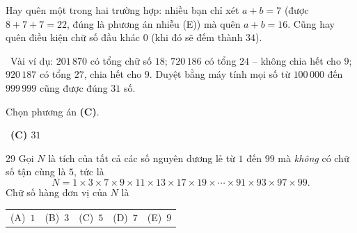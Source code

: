 \documentclass[11pt]{article}
\makeatletter
\providecommand{\AnsWord}{Đáp số}
\newenvironment{probbox}[2]{\begin{probboxT}{#1}{#2}}{\end{probboxT}}
\newcommand{\ans}[1]{\par\smallskip{\bfseries\color{tmGreen!88!black}\AnsWord:}\ {\bfseries\color{AnsRed}#1}\par}
\newcommand{\verify}[1]{\par\smallskip\noindent{\bfseries\color{tmGreen!80!black}\faCheckCircle\ \CheckWord}\ #1\par}
\newcommand{\choices}[5]{\par\smallskip\noindent
  \begin{tabularx}{\linewidth}{@{}XXXXX@{}}(A)\ #1&(B)\ #2&(C)\ #3&(D)\ #4&(E)\ #5\end{tabularx}\par}
\def\AnsWord{Đáp số}
\def\CheckWord{Thử lại:}
\makeatother
\begin{document}
{\begin{warnbox}Hay quên một trong hai trường hợp: nhiều bạn chỉ xét $a+b=7$ (được $8+7+7=22$, đúng là phương án nhiễu (E)) mà quên $a+b=16$. Cũng hay quên điều kiện chữ số đầu khác $0$ (khi đó sẽ đếm thành $34$).\end{warnbox}

\verify{Vài ví dụ: $201\,870$ có tổng chữ số $18$; $720\,186$ có tổng $24$ -- không chia hết cho $9$; $920\,187$ có tổng $27$, chia hết cho $9$. Duyệt bằng máy tính mọi số từ $100\,000$ đến $999\,999$ cũng được đúng $31$ số.}
Chọn phương án \textbf{(C)}.
\ans{(C) $31$}
}


\begin{probbox}{29}{\relax}
Gọi $N$ là tích của tất cả các số nguyên dương lẻ từ $1$ đến $99$ mà \emph{không} có chữ số tận cùng là $5$, tức là
\[N=1\times 3\times 7\times 9\times 11\times 13\times 17\times 19\times\cdots\times 91\times 93\times 97\times 99.\]
Chữ số hàng đơn vị của $N$ là
\choices{$1$}{$3$}{$5$}{$7$}{$9$}
\end{probbox}
\end{document}
